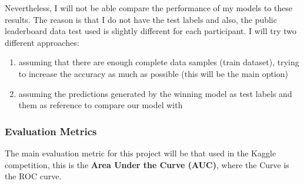 \documentclass[]{article}
\begin{document}
Nevertheless, I will not be able compare the performance of my models to these results. The reason is that I do not have the test labels and also, the public leaderboard data test used is slightly different for each participant. I will try two different approaches:
\begin{enumerate}
	\item assuming that there are enough complete data samples (train dataset), trying to increase the accuracy as much as possible (this will be the main option)
	\item assuming the predictions generated by the winning model as test labels and them as reference to compare our model with
\end{enumerate}

\subsubsection{Evaluation Metrics}\label{evaluation-metrics}

The main evaluation metric for this project will be that used in the Kaggle competition, this is the \textbf{Area Under the Curve (AUC)}, where the Curve is the ROC curve.
\end{document}
